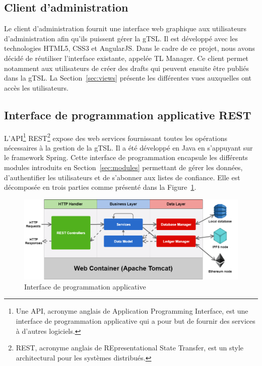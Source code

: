 \documentclass{tnreport}
\begin{document}
\subsection{Client d'administration}

Le client d'administration fournit une interface web graphique aux utilisateurs d'administration afin qu'ils puissent gérer la gTSL. Il est développé avec les technologies HTML5, CSS3 et AngularJS. Dans le cadre de ce projet, nous avons décidé de réutiliser l'interface existante, appelée TL Manager. Ce client permet notamment aux utilisateurs de créer des drafts qui peuvent ensuite être publiés dans la gTSL. La Section~\ref{sec:views} présente les différentes vues auxquelles ont accès les utilisateurs.

\subsection{Interface de programmation applicative REST}

L'API\footnote{Une API, acronyme anglais de Application Programming Interface, est une interface de programmation applicative qui a pour but de fournir des services à d'autres logiciels.} REST\footnote{REST, acronyme anglais de REpresentational State Transfer, est un style architectural pour les systèmes distribués.} expose des web services fournissant toutes les opérations nécessaires à la gestion de la gTSL. Il a été développé en Java en s'appuyant sur le framework Spring. Cette interface de programmation encapsule les différents modules introduits en Section~\ref{sec:modules} permettant de gérer les données, d'authentifier les utilisateurs et de s'abonner aux listes de confiance. Elle est décomposée en trois parties comme présenté dans la Figure~\ref{fig:rest-api}.

\begin{figure}[h]
	\centering
	\includegraphics[scale=0.52]{figures/rest-api}
	\caption{Interface de programmation applicative}
	\label{fig:rest-api}
\end{figure}
\end{document}
